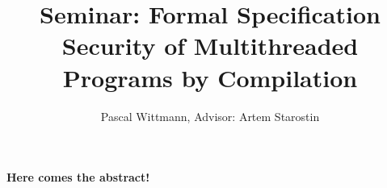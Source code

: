 \documentclass[a4paper,10pt]{llncs}
\begin{document}
\title{{\normalsize Seminar: Formal Specification} \\[1ex]
  Security of Multithreaded Programs by Compilation}
\author{Pascal Wittmann, Advisor: Artem Starostin}
\institute{}

\maketitle



{\bf Here comes the abstract!}


\end{document}
